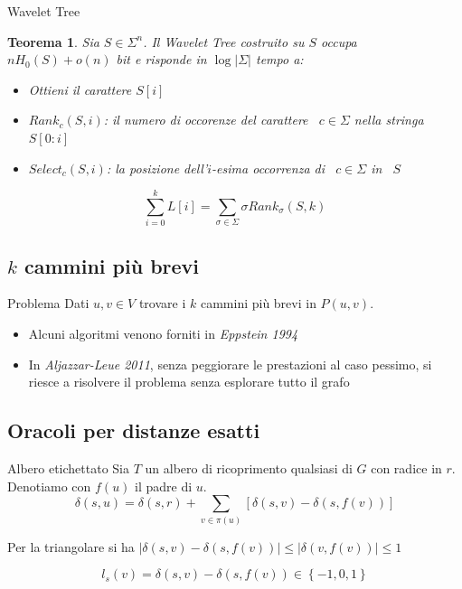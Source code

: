 \documentclass{beamer}
\newcounter{counter1}
\theoremstyle{plain}
\newtheorem{myteo}[counter1]{Teorema}
\theoremstyle{definition}
\theoremstyle{remark}
\newcommand{\set}[1]{\left\{#1\right\}}
\newcommand{\pa}[1]{\left(#1\right)}
\newcommand{\bra}[1]{\left[#1\right]}
\newcommand{\abs}[1]{\left|#1\right|}
\begin{document}
\begin{frame}{Wavelet Tree}
  \label{frame:wavelettree}
  \begin{myteo}
    Sia $S \in\Sigma ^n$. Il Wavelet Tree costruito su $S$ occupa
    $nH_0(S) + o(n)$ bit e risponde in $\log \abs{\Sigma}$ tempo a:
    \begin{itemize}
    \item Ottieni il carattere $S[i]$
    \item $Rank_c (S,i)$: il numero di occorenze del carattere~ $c\in
      \Sigma$ nella stringa $S[0:i]$
    \item $Select _c (S,i)$: la posizione dell'$i$-esima occorrenza
      di~ $c\in \Sigma$ in~ $S$
    \end{itemize}
  \end{myteo}

  \[ \sum _{i=0} ^ {k} L[i] = \sum _{\sigma \in \Sigma} \sigma Rank
  _\sigma (S,k) \]
\end{frame}

\subsection*{$k$ cammini pi\`u brevi}
\label{sec:kcamm}

\begin{frame}
  \begin{block}{Problema}
    Dati $u,v \in V$ trovare i $k$ cammini pi\`u brevi in $P(u,v)$.
  \end{block}
  \vfill
  
  \begin{itemize}
  \item Alcuni algoritmi venono forniti in \textit{Eppstein 1994}
  \item In \textit{Aljazzar-Leue 2011}, senza peggiorare le
    prestazioni al caso pessimo, si riesce a risolvere il problema
    senza esplorare tutto il grafo
  \end{itemize}
  
\end{frame}

\subsection*{Oracoli per distanze esatti}
\label{sec:oracolidist}

\begin{frame}{Albero etichettato}
  Sia $T$ un albero di ricoprimento qualsiasi di $G$ con radice in
  $r$. Denotiamo con $f(u)$ il padre di $u$.
  \vfill
  \[ \delta\pa{ s,u} = \delta\pa{ s,r} + \sum _{v\in \pi (u)} \bra{
    \delta\pa{ s,v} - \delta\pa{ s,f(v) } } \]
  
  Per la triangolare si ha $\abs{\delta\pa{ s,v} - \delta\pa{ s,f(v)}
  } \le \abs{\delta\pa{v,f(v)}} \le 1$ \vfill
  
  \pause
  \[ l_s(v) = \delta\pa{s,v} - \delta\pa{ s, f(v) } \in \set{
    -1,0,1} \]
\end{frame}
\end{document}
